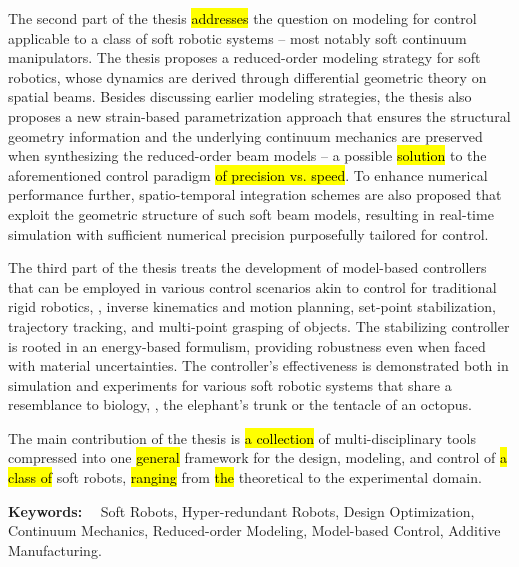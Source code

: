 The second part of the thesis \hl{addresses} the question on modeling for control applicable to a class of soft robotic systems -- most notably soft continuum manipulators. The thesis proposes a reduced-order modeling strategy for soft robotics, whose dynamics are derived through differential geometric theory on spatial beams. Besides discussing earlier modeling strategies, the thesis also proposes a new strain-based parametrization approach that ensures the structural geometry information and the underlying continuum mechanics are preserved when synthesizing the reduced-order beam models -- a possible \hl{solution} to the aforementioned control paradigm \hl{of precision vs. speed}. To enhance numerical performance further, spatio-temporal integration schemes are also proposed that exploit the geometric structure of such soft beam models, resulting in real-time simulation with sufficient numerical precision purposefully tailored for control.

The third part of the thesis treats the development of model-based controllers that can be employed in various control scenarios akin to control for traditional rigid robotics, \eg, inverse kinematics and motion planning, set-point stabilization, trajectory tracking, and multi-point grasping of objects. The stabilizing controller is rooted in an energy-based formulism, providing robustness even when faced with material uncertainties. The controller's effectiveness is demonstrated both in simulation and experiments for various soft robotic systems that share a resemblance to biology, \eg, the elephant's trunk or the tentacle of an octopus.

The main contribution of the thesis is \hl{a collection} of multi-disciplinary tools compressed into one \hl{general} framework for the design, modeling, and control of \hl{a class of} soft robots, \hl{ranging} from \hl{the} theoretical to the experimental domain.

\vspace*{5pt}\noindent
\textbf{Keywords:} \ \ Soft Robots, Hyper-redundant Robots, Design Optimization, Continuum Mechanics, Reduced-order Modeling, Model-based Control, Additive Manufacturing.

